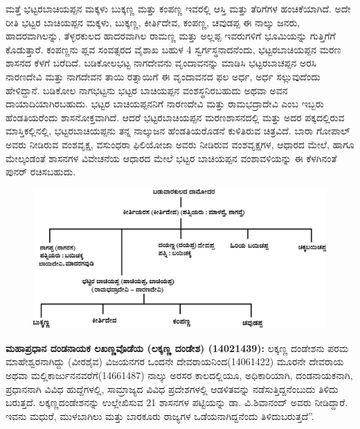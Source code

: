 ಮತ್ತೆ ಭಟ್ಟರಬಾಚಿಯಪ್ಪನ ಮಕ್ಕಳು ಬುಕ್ಕಣ್ಣ ಮತ್ತು ಕಂಪಣ್ಣ ಇವರಲ್ಲಿ ಆಸ್ತಿ ಮತ್ತು ತೆರಿಗೆಗಳ ಹಂಚಿಕೆಯಾಗಿದೆ. ಅದೇ ರೀತಿ ಭಟ್ಟರ ಬಾಚಿಯಪ್ಪನ ಮಕ್ಕಳು, ಬುಕ್ಕಣ್ಣ, ಕೀರ್ತಿದೇವ, ಕಂಪಣ್ಣ, ಚವುಡಪ್ಪ ಈ ನಾಲ್ಕು ಜನರು, ಹಾದರವಾಗಿಲನ್ನು, ತೆಳ್ಳರಕುಲದ ಹಾದರವಾಗಿಲ ರಾಮಣ್ಣ ಮತ್ತು ಅಲ್ಲಪ್ಪ ಇವರುಗಳಿಗೆ ಭೂಮಿಯನ್ನು ಗುತ್ತಿಗೆಗೆ ಕೊಡುತ್ತಾರೆ. ಕಂಪಣ್ಣನು ಪ್ಲವ ಸಂವತ್ಸರದ ವೈಶಾಖ ಬಹುಳ 4 ಸ್ವರ್ಗಸ್ಥನಾದನೆಂದು, ಭಟ್ಟರಬಾಚಿಯಪ್ಪನ ಮರಣ ಶಾಸನದ ಕೆಳಗೆ ಬರೆದಿದೆ. ಬಡಿಕೋಲಭಟ್ಟ ನಾಗದೇವನು ವೃಂದಾವನನ್ನು ಮಾಡಿಸಿ ಭಟ್ಟರಬಾಚಪ್ಪನ ಅರಸಿ ನಾರಣದೇವಿ ಮತ್ತು ನಾಗದೇವನ ತಾಯಿ ರತ್ನಾಯಿಗೆ ಈ ವೃಂದಾವನದ ಫಲ ಅರ್ಧ, ಅರ್ಧ ಸಲ್ಲುವುದೆಂದು ಹೇಳಿದ್ದಾನೆ. ಬಡಿಕೋಲ ನಾಗಭಟ್ಟನು ಭಟ್ಟರ ಬಾಚಿಯಪ್ಪನ ವಂಶಸ್ಥನಿರಬಹುದು ಅಥವಾ ಅವನ ದಾಯಾದಿಯಾಗಿರಬಹುದು. ಭಟ್ಟರ ಬಾಚಿಯಪ್ಪನನಿಗೆ ನಾರಣದೇವಿ ಮತ್ತು ರಾಮಭದ್ರಾದೇವಿ ಎಂಬ ಇಬ್ಬರು ಹೆಂಡತಿಯರೆಂದು ಶಾಸನೋಕ್ತವಾಗಿದೆ. ಆದರೆ ಭಟ್ಟರಬಾಚಿಯಪ್ಪನ ಮರಣಶಾಸನದಲ್ಲಿ ಮತ್ತು ಅದರ ಪಕ್ಕದಲ್ಲಿರುವ ಮಾಸ್ತಿಕಲ್ಲಿನಲ್ಲಿ, ಭಟ್ಟರಬಾಚಿಯಪ್ಪನು ತನ್ನ ನಾಲ್ಕುಜನ ಹೆಂಡತಿಯರೊಡನೆ ಕುಳಿತಿರುವ ಚಿತ್ರವಿದೆ. ಬಾರಾ ಗೋಪಾಲ್​ ಅವರು ನೀಡಿರುವ ವಂಶವೃಕ್ಷ, ವಸುಂಧರಾ ಫಿಲಿಯೋಜಾ ಅವರು ನೀಡಿರುವ ವಂಶವೃಕ್ಷಗಳ, ಆಧಾರದ ಮೇಲೆ, ಹಾಗೂ ಮೇಲ್ಕಂಡಂತೆ ಶಾಸನಗಳ ವಿವೇಚನೆಯ ಆಧಾರದ ಮೇಲೆ ಭಟ್ಟರ ಬಾಚಿಯಪ್ಪನ ವಂಶಾವಳಿಯನ್ನು ಈ ಕೆಳಗಿನಂತೆ ಪುನರ್ ರಚಿಸಬಹುದು.

\begin{figure}[H]
\includegraphics[scale=1.17]{images/chap3/chap3fig37.jpeg}
\end{figure}

\textbf{ಮಹಾಪ್ರಧಾನ ದಂಡನಾಯಕ ಲಖಣ್ಣವೊಡೆಯ (ಲಕ್ಕಣ್ಣ ದಂಡೇಶ) (1402\general{\enginline{-}}1439):} ಲಕ್ಕಣ್ಣ ದಂಡೇಶನು ಪರಮ ಮಾಹೇಶ್ವರನಾಗಿದ್ದು (ವೀರಶೈವ) ವಿಜಯನಗರ ಒಂದನೇ ದೇವರಾಯನಿಂದ(1406\enginline{-}1422) ಮೂರನೇ ದೇವರಾಯ ಅಥವಾ ಮಲ್ಲಿಕಾರ್ಜುನನವರೆಗೆ(1466\enginline{-}1487) ನಾಲ್ಕು ಅರಸರ ಕಾಲದಲ್ಲಿಯೂ, ಅಧಿಕಾರಿಯಾಗಿ, ದಂಡನಾಯಕನಾಗಿ, ಪ್ರಧಾನನಾಗಿ ವಿವಿಧ ಹುದ್ದೆಗಳಲ್ಲಿ, ಸಾಮ್ರಾಜ್ಯದ ವಿವಿಧ ಪ್ರದೇಶಗಳಲ್ಲಿ ಆಡಳಿತವನ್ನು ನಡೆಸುತ್ತಿದ್ದನೆಂಬುದು ತಿಳಿದು ಬರುತ್ತದೆ. ಲಕ್ಕಣ್ಣದಂಡೇಶನನ್ನು ಉಲ್ಲೇಖಿಸುವ 21 ಶಾಸನಗಳ ಪಟ್ಟಿಯನ್ನು ಡಾ. ವಿ.ಶಿವಾನಂದ್​ ಅವರು ನೀಡಿದ್ದಾರೆ. ಇವನು ಮಧುರೆ, ಮುಳಬಾಗಿಲು ಮತ್ತು ಬಾರಕೂರು ರಾಜ್ಯಗಳ ಒಡೆಯನಾಗಿದ್ದನೆಂದು ತಿಳಿದುಬರುತ್ತದೆ”.

